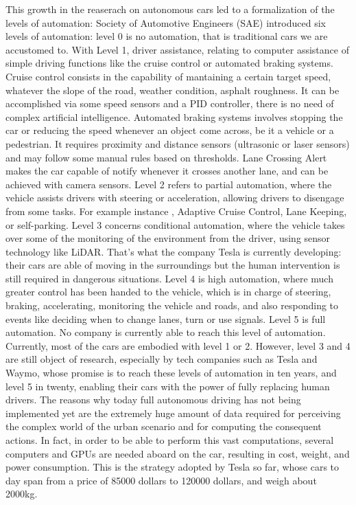 This growth in the reaserach on autonomous cars led to a formalization of the levels of automation: Society of Automotive Engineers (SAE) introduced six levels of automation: level 0 is no automation, that is traditional cars we are accustomed to. With Level 1, driver assistance, relating to computer assistance of simple driving functions like the cruise control or automated braking systems. Cruise control consists in the capability of mantaining a certain target speed, whatever the slope of the road, weather condition, asphalt roughness. It can be accomplished via some speed sensors and a PID controller, there is no need of complex artificial intelligence. Automated braking systems involves stopping the car or reducing the speed whenever an object come across, be it a vehicle or a pedestrian. It requires proximity and distance sensors (ultrasonic or laser sensors) and may follow some manual rules based on thresholds. Lane Crossing Alert makes the car capable of notify whenever it crosses another lane, and can be achieved with camera sensors.
Level 2 refers to partial automation, where the vehicle assists drivers with steering or acceleration, allowing drivers to disengage from some tasks.  For example instance , Adaptive Cruise Control, Lane Keeping, or self-parking.
Level 3 concerns conditional automation, where the vehicle takes over some of the monitoring of the environment from the driver, using sensor technology like LiDAR. That's what the company Tesla is currently developing: their cars are able of moving in the surroundings but the human intervention is still required in dangerous situations.
Level 4 is high automation, where much greater control has been handed to the vehicle, which is in charge of steering, braking, accelerating, monitoring the vehicle and roads, and also responding to events like deciding when to change lanes, turn or use signals.
Level 5 is full automation. No company is currently able to reach this level of automation.
Currently, most of the cars are embodied with level 1 or 2. However, level 3 and 4 are still object of research, especially by tech companies such as Tesla and Waymo, whose promise is to reach these levels of automation in ten years, and level 5 in twenty, enabling their cars with the power of fully replacing human drivers.
The reasons why today full autonomous driving has not being implemented yet are the extremely huge amount of data required for perceiving the complex world of the urban scenario and for computing the consequent actions. In fact, in order to be able to perform this vast computations, several computers and GPUs are needed aboard on the car, resulting in cost, weight, and power consumption. This is the strategy adopted by Tesla so far, whose cars to day span from a price of 85000 dollars to 120000 dollars, and weigh about 2000kg. 
